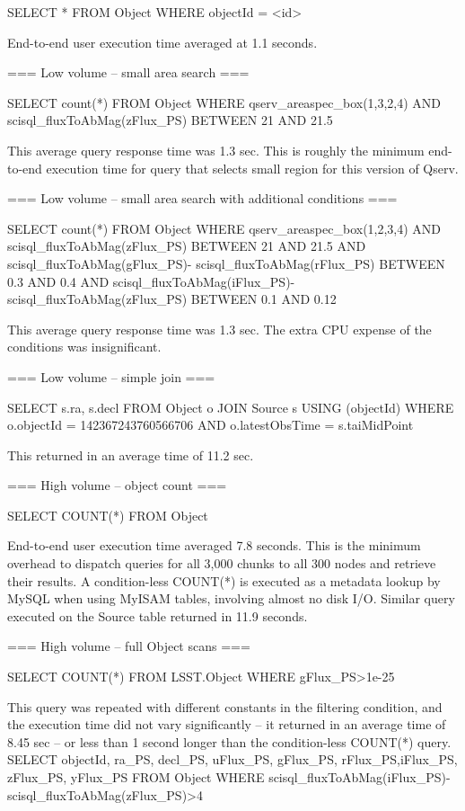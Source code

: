 {{{
SELECT * FROM Object WHERE objectId = <id>
}}}

End-to-end user execution time averaged at 1.1 seconds.

=== Low volume – small area search ===

{{{
	SELECT	count(*)
	FROM	Object
	WHERE	qserv_areaspec_box(1,3,2,4) AND 
		scisql_fluxToAbMag(zFlux_PS) BETWEEN 21 AND 21.5
}}}

This average query response time was 1.3 sec. This is roughly the minimum end-to-end execution time for query that selects small region for this version of Qserv.

=== Low volume – small area search with additional conditions ===

{{{ 
SELECT	count(*) FROM Object 
WHERE	qserv_areaspec_box(1,2,3,4)
AND	scisql_fluxToAbMag(zFlux_PS) BETWEEN 21 AND 21.5
AND	scisql_fluxToAbMag(gFlux_PS)-
			scisql_fluxToAbMag(rFlux_PS) BETWEEN 0.3 AND 0.4
AND	scisql_fluxToAbMag(iFlux_PS)-
			scisql_fluxToAbMag(zFlux_PS) BETWEEN 0.1 AND 0.12
}}}

This average query response time was 1.3 sec. The extra CPU expense of the conditions was insignificant.

=== Low volume – simple join ===

{{{
	SELECT	s.ra, s.decl 
	FROM	Object o 
	JOIN	Source s USING (objectId)
	WHERE	o.objectId = 142367243760566706
	AND	o.latestObsTime = s.taiMidPoint
}}}

This returned in an average time of 11.2 sec.

=== High volume – object count ===

{{{
	SELECT COUNT(*) FROM Object
}}}

End-to-end user execution time averaged 7.8 seconds. This is the minimum overhead to dispatch queries for all 3,000 chunks to all 300 nodes and retrieve their results. A condition-less COUNT(*) is executed as a metadata lookup by MySQL when using MyISAM tables, involving almost no disk I/O.
Similar query executed on the Source table returned in 11.9 seconds.

=== High volume – full Object scans ===

{{{
	SELECT COUNT(*) FROM LSST.Object WHERE gFlux_PS>1e-25
}}}

This query was repeated with different constants in the filtering condition, and the execution time did not vary significantly – it returned in an average time of 8.45 sec – or less than 1 second longer than the condition-less 
COUNT(*) query.
{{{
	SELECT	objectId, ra_PS, decl_PS, uFlux_PS, gFlux_PS,
		rFlux_PS,iFlux_PS, zFlux_PS, yFlux_PS
	FROM	Object
	WHERE	scisql_fluxToAbMag(iFlux_PS)-
		scisql_fluxToAbMag(zFlux_PS)>4
}}}

